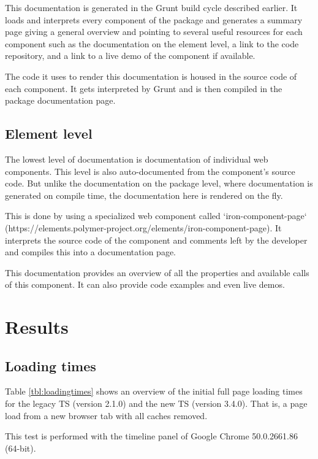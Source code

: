\documentclass[journal,compsoc,a4paper]{IEEEtran}
\begin{document}
This documentation is generated in the Grunt build cycle described earlier.
It loads and interprets every component of the package and generates a summary
page giving a general overview and pointing to several useful resources for each
component such as the documentation on the element level, a link to the code
repository, and a link to a live demo of the component if available.

The code it uses to render this documentation is housed in the source code of
each component. It gets interpreted by Grunt and is then compiled in the package
documentation page.

\subsection{Element level}
The lowest level of documentation is documentation of individual web components.
This level is also auto-documented from the component's source code.
But unlike the documentation on the package level, where documentation is
generated on compile time, the documentation here is rendered on the fly.

This is done by using a specialized web component called `iron-component-page`
(https://elements.polymer-project.org/elements/iron-component-page).
It interprets the source code of the component and comments left by the developer
and compiles this into a documentation page.

This documentation provides an overview of all the properties and available
calls of this component. It can also provide code examples and even live
demos.

\section{Results}
\subsection{Loading times}
\label{Loading times}
Table \ref{tbl:loadingtimes} shows an overview of the initial full page loading
times for the legacy TS (version 2.1.0) and the new TS (version 3.4.0). That is,
a page load from a new browser tab with all caches removed.

This test is performed with the timeline panel of Google Chrome 50.0.2661.86 (64-bit).
\end{document}
